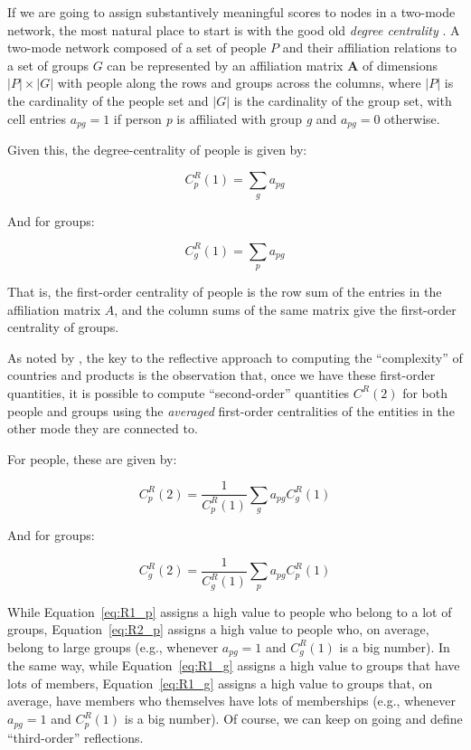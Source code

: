 \documentclass[a4paper,fleqn]{cas-sc}
\begin{document}
If we are going to assign substantively meaningful scores to nodes in a two-mode network, the most natural place to start is with the good old \textit{degree centrality} \citep{faust1997centrality}. A two-mode network composed of a set of people $P$ and their affiliation relations to a set of groups $G$ can be represented by an affiliation matrix $\mathbf{A}$ of dimensions $|P| \times |G|$ with people along the rows and groups across the columns, where $|P|$ is the cardinality of the people set and $|G|$ is the cardinality of the group set, with cell entries $a_{pg}= 1$ if person \textit{p} is affiliated with group \textit{g} and $a_{pg}= 0$ otherwise. 

Given this, the degree-centrality of people is given by:

\begin{equation}
    C^R_p(1) = \sum_g a_{pg}
    \label{eq:R1_p}
\end{equation}

And for groups:

\begin{equation}
   C^R_g(1) = \sum_p a_{pg}
  \label{eq:R1_g}
\end{equation}

That is, the first-order centrality of people is the row sum of the entries in the affiliation matrix $A$, and the column sums of the same matrix give the first-order centrality of groups. 

As noted by \citet{hidalgo2009building}, the key to the reflective approach to computing the ``complexity'' of countries and products is the observation that, once we have these first-order quantities, it is possible to compute ``second-order'' quantities $C^R(2)$ for both people and groups using the \textit{averaged} first-order centralities of the entities in the other mode they are connected to. 

For people, these are given by:

\begin{equation}
    C^R_p(2) = \frac{1}{C^R_p(1)}\sum_g a_{pg}C^R_g(1)
    \label{eq:R2_p}
\end{equation}

And for groups:

\begin{equation}
   C^R_g(2) = \frac{1}{C^R_g(1)}\sum_p a_{pg}C^R_p(1)
    \label{eq:R2_g}
\end{equation}

While Equation~\ref{eq:R1_p} assigns a high value to people who belong to a lot of groups, Equation~\ref{eq:R2_p} assigns a high value to people who, on average, belong to large groups (e.g., whenever $a_{pg} = 1$ and $C^R_g(1)$ is a big number). In the same way, while Equation~\ref{eq:R1_g} assigns a high value to groups that have lots of members, Equation~\ref{eq:R1_g} assigns a high value to groups that, on average, have members who themselves have lots of memberships (e.g., whenever $a_{pg} = 1$ and $C^R_p(1)$ is a big number). Of course, we can keep on going and define ``third-order'' reflections. 
\end{document}
